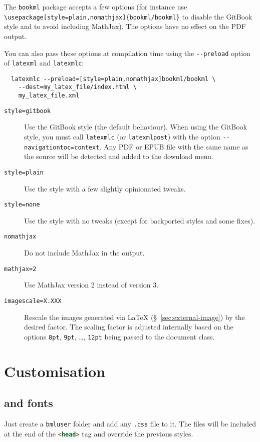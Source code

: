 \documentclass[a4paper,british]{article}
\def\ltxinline{\lstinline[style=bookml]}
\def\htmlinline{\lstinline[language=html]}
\begin{document}
The \ltxinline|bookml| package accepts a few options (for instance use \ltxinline|\usepackage[style=plain,nomathjax]{bookml/bookml}| to disable the GitBook style and to avoid including MathJax). The options have no effect on the PDF output.

You can also pass these options at compilation time using the \ltxinline|--preload| option of \ltxinline|latexml| and \ltxinline|latexmlc|:
\begin{lstlisting}
  latexmlc --preload=[style=plain,nomathjax]bookml/bookml \
    --dest=my_latex_file/index.html \
    my_latex_file.xml
\end{lstlisting}

\begin{description}
  \item[\texttt{style=gitbook}] Use the GitBook style (the default behaviour). When using the GitBook style, you must call \ltxinline|latexmlc| (or \ltxinline|latexmlpost|) with the option \ltxinline|--navigationtoc=context|. Any PDF or EPUB file with the same name as the source will be detected and added to the download menu.
  \item[\texttt{style=plain}] Use the \LaTeXML{} style with a few slightly opinionated tweaks.
  \item[\texttt{style=none}] Use the \LaTeXML{} style with no tweaks (except for backported styles and some fixes).
  \item[\texttt{nomathjax}] Do not include MathJax in the output.
  \item[\texttt{mathjax=2}] Use MathJax version 2 instead of version 3.
  \item[\texttt{imagescale=X.XXX}] Rescale the images generated via \LaTeX{} (\S~\ref{sec:external-image}) by the desired factor. The scaling factor is adjusted internally based on the options \ltxinline|8pt|, \ltxinline|9pt|, \dots, \ltxinline|12pt| being passed to the document class.
\end{description}

\section{Customisation}

\subsection{\CSS{} and fonts}
Just create a \lstinline|bmluser| folder and add any \lstinline|.css| file to it. The files will be included at the end of the \htmlinline|<head>| tag and override the previous styles.
\end{document}
